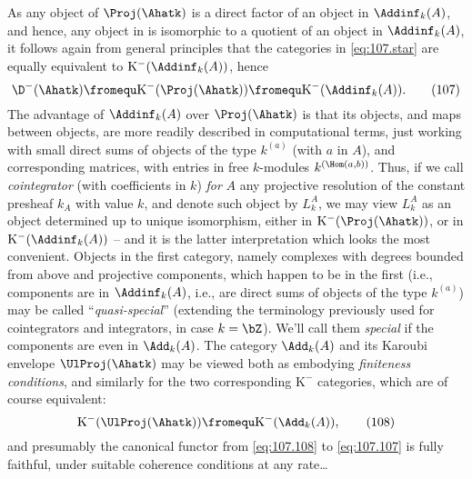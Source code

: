 As any object of $\Proj(\Ahatk)$ is a direct factor of an object in
$\Addinf_k(A)$, and hence, any object in \Ahatk{} is isomorphic to a
quotient of an object in $\Addinf_k(A)$, it follows again from general
principles that the categories in \eqref{eq:107.star} are equally
equivalent to $\mathrm K^-(\Addinf_k(A))$, hence
\begin{equation}
  \label{eq:107.107}
  \D^-(\Ahatk) \fromequ \mathrm K^-(\Proj(\Ahatk)) \fromequ
  \mathrm K^-(\Addinf_k(A)).\tag{107}
\end{equation}
The advantage of $\Addinf_k(A)$ over $\Proj(\Ahatk)$ is that its
objects, and maps between objects, are more readily described in
computational terms, just working with small direct sums of objects of
the type $k^{(a)}$ (with $a$ in $A$), and corresponding matrices, with
entries in free $k$-modules $k^{(\Hom(a,b))}$. Thus, if we call
\emph{cointegrator} (with coefficients in $k$) \emph{for} $A$ any
projective resolution of the constant presheaf $k_A$ with value $k$,
and denote such object by $L_k^A$, we may view $L_k^A$ as an object
determined up to unique isomorphism, either in $\mathrm
K^-(\Proj(\Ahatk))$, or in $\mathrm K^-(\Addinf_k(A))$ -- and it is
the latter interpretation which looks the most convenient. Objects in
the first category, namely complexes with degrees bounded from above
and projective components, which happen to be in the first (i.e.,
components are in $\Addinf_k(A)$, i.e., are direct sums of objects of
the type $k^{(a)}$) may be called ``\emph{quasi-special}'' (extending
the terminology previously used for cointegrators and integrators, in
case $k=\bZ$). We'll call them \emph{special} if the components are
even in $\Add_k(A)$. The category $\Add_k(A)$ and its Karoubi envelope
$\UlProj(\Ahatk)$ may be viewed both as embodying \emph{finiteness
  conditions}, and similarly for the two corresponding $\mathrm K^-$
categories, which are of course equivalent:
\begin{equation}
  \label{eq:107.108}
  \mathrm K^-(\UlProj(\Ahatk)) \fromequ \mathrm K^-(\Add_k(A)),\tag{108}
\end{equation}
and presumably the canonical functor from \eqref{eq:107.108} to
\eqref{eq:107.107} is fully faithful, under suitable coherence
conditions at any rate\ldots

\bigbreak
\presectionfill{}\par

